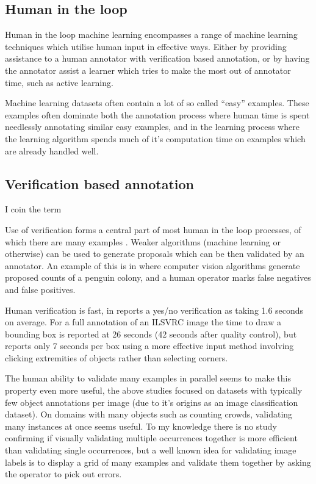 \subsection{Human in the loop}

Human in the loop machine learning encompasses a range of machine learning techniques which utilise human input in effective ways. Either by providing assistance to a human annotator with verification based annotation, or by having the annotator assist a learner which tries to make the most out of annotator time, such as active learning.

Machine learning datasets often contain a lot of so called ``easy'' examples. These examples often dominate both the annotation process where human time is spent needlessly annotating similar easy examples, and in the learning process where the learning algorithm spends much of it's computation time on examples which are already handled well. 


\subsection{Verification based annotation}

I coin the term 


Use of verification forms a central part of most human in the loop processes, of which there are many examples \cite{Yao2012, McNeill2011, Adhikaria2018, Castrejon2017, Papadopoulos2016, Russakovsky2015a}. Weaker algorithms (machine learning or otherwise) can be used to generate proposals which can be then validated by an annotator. An example of this is in \cite{McNeill2011} where computer vision algorithms generate proposed counts of a penguin colony, and a human operator marks false negatives and false positives.

Human verification is fast, in \cite{Papadopoulos2016} reports a yes/no verification as taking 1.6 seconds on average. For a full annotation of an \gls{ILSVRC} image \cite {Su2012a} the time to draw a bounding box is reported at 26 seconds (42 seconds after quality control), but \cite{Papadopoulos2017} reports only 7 seconds per box using a more effective input method involving clicking extremities of objects rather than selecting corners. 


The human ability to validate many examples in parallel seems to make this property even more useful, the above studies focused on datasets with typically few object annotations per image (due to it's origins as an image classification dataset). On domains with many objects such as counting crowds, validating many instances at once seems useful. To my knowledge there is no study confirming if visually validating multiple occurrences together is more efficient than validating single occurrences, but a well known idea for validating image labels is to display a grid of many examples and validate them together by asking the operator to pick out errors.


